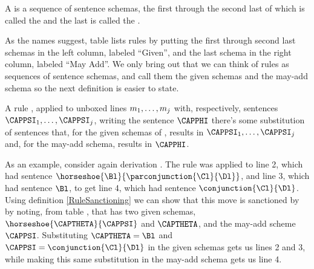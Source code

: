 \begin{majorILnc}{}
	A  is a sequence of sentence schemas, the first through the second last of which is called the  and the last is called the . 
\end{majorILnc}
\noindent{}As the names suggest, table  lists rules by putting the first through second last schemas in the left column, labeled ``Given'', and the last schema in the right column, labeled ``May Add''. 
We only bring out that we can think of rules as sequences of sentence schemas, and call them the given schemas and the may-add schema so the next definition is easier to state.
\begin{majorILnc}{}
	A rule , applied to unboxed lines $m_1,\ldots,m_{j}$ with, respectively, sentences $\CAPPSI_1,\ldots,\CAPPSI_{\integer{j}}$,  writing the sentence $\CAPPHI$ \Iff there's some substitution of \GSL{} sentences that, for the given schemas of , results in $\CAPPSI_1,\ldots,\CAPPSI_{\integer{j}}$ and, for the may-add schema, results in $\CAPPHI$. 
\end{majorILnc}
\noindent{}As an example, consider again derivation . 
The rule  was applied to line 2, which had sentence $\horseshoe{\Bl}{\parconjunction{\Cl}{\Dl}}$, and line 3, which had sentence $\Bl$, to get line 4, which had sentence $\conjunction{\Cl}{\Dl}$. 
Using definition \ref{RuleSanctioning} we can show that this move is sanctioned by  by noting, from table , that  has two given schemas, $\horseshoe{\CAPTHETA}{\CAPPSI}$ and $\CAPTHETA$, and the may-add scheme $\CAPPSI$. 
Substituting $\CAPTHETA=\Bl$ and $\CAPPSI=\conjunction{\Cl}{\Dl}$ in the given schemas gets us lines 2 and 3, while making this same substitution in the may-add schema gets us line 4. 


